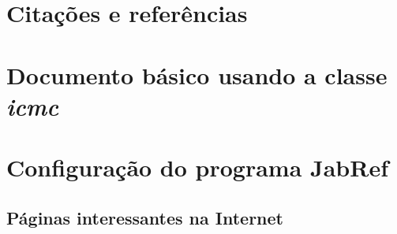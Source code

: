 \documentclass[doutorado, spanish, brazil, english]{packages/icmc}
\begin{document}
\chapter{Citações e referências}
\label{chapter:citacoes}



% 

\postextual





\glsaddall
\printglossaries


\begin{apendicesenv}

    \chapter{Documento básico usando a classe \textit{icmc}}
    \label{chapter:documento-basico}
    
    
    \chapter{Configuração do programa JabRef}
    \label{chapter:configuracao-jabref}
    

\end{apendicesenv}



\begin{anexosenv}

    \chapter{Páginas interessantes na Internet} 
    \label{chapter:paginas-interessantes}
    

\end{anexosenv}
\end{document}
